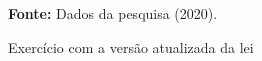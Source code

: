 \begin{figure}[ht!]
\centering

\caption{\textmd{Exercício com a versão atualizada da lei}}
\label{fig:ndevesp}

\par\medskip\textbf{Fonte:} Dados da pesquisa (2020). \par\medskip

\end{figure}

